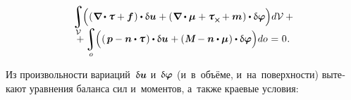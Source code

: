 \begin{otherlanguage}{russian}
\nopagebreak\vspace{-0.33em}
\begin{multline*}\label{virtualworkprinciple.2:micropolarcontinuum}
\integral\displaylimits_{\mathcal{V}} \hspace{-0.64ex} \left(^{\mathstrut} ( \hspace{.12ex} \boldnabla \hspace{-0.1ex} \dotp \forcestresstensor + \bm{f} \hspace{.12ex} ) \dotp \variation{\fieldofdisplacements} \hspace{.1ex}
+ ( \hspace{.12ex} \boldnabla \dotp \couplestresstensor \hspace{.1ex} + \forcestresstensor_{\Xcompanion} \hspace{-0.1ex} + \bm{m} \hspace{.1ex} ) \dotp \variation{\fieldofrotations} \right) \hspace{-0.32ex} d\mathcal{V} \hspace{0.5ex} + \\[-1.1em]
%
+ \integral\displaylimits_o \hspace{-0.64ex} \left(^{\mathstrut} ( \hspace{.32ex} \bm{p} - \bm{n} \dotp \forcestresstensor \hspace{.2ex} ) \dotp \variation{\fieldofdisplacements} \hspace{.1ex}
+ ( \hspace{.1ex} \mathboldM - \bm{n} \dotp \couplestresstensor \hspace{.1ex} ) \dotp \variation{\fieldofrotations} \right) \hspace{-0.32ex} do \hspace{0.12ex} = \hspace{0.1ex} 0 \hspace{0.1ex}.
\end{multline*}

Из произвольности вариаций~$\updelta\hspace{-0.1ex}\bm{u}$ и~$\updelta\hspace{-0.1ex}\bm{\varphi}$ (и~в~объёме, и~на~поверхности) вытекают уравнения баланса сил и~моментов, а~также краевые условия:


\end{otherlanguage}
